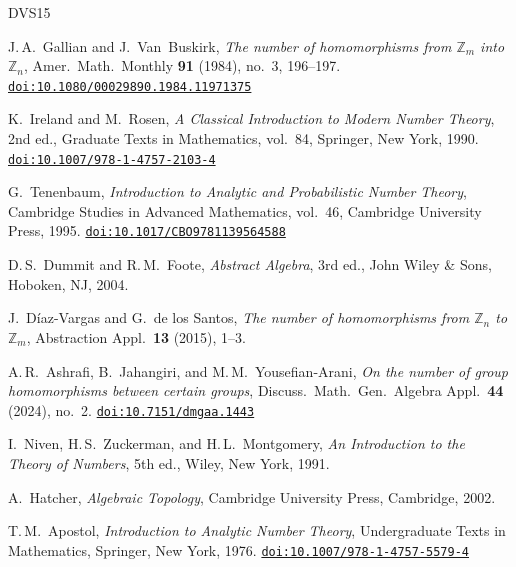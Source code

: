 \documentclass[12pt]{amsart}
\theoremstyle{bluehead}
\theoremstyle{orangehead}
\theoremstyle{greenhead}
\begin{document}
\begin{thebibliography}{DVS15}

J.\,A.\ Gallian and J.\ Van~Buskirk,
\textit{The number of homomorphisms from $\mathbb{Z}_m$ into $\mathbb{Z}_n$},
Amer.\ Math.\ Monthly \textbf{91} (1984), no.\ 3, 196--197.
\href{https://doi.org/10.1080/00029890.1984.11971375}{%
  \texttt{doi:10.1080/00029890.1984.11971375}}

K.\ Ireland and M.\ Rosen,
\textit{A Classical Introduction to Modern Number Theory},
2nd ed., Graduate Texts in Mathematics, vol.\ 84,
Springer, New York, 1990.
\href{https://doi.org/10.1007/978-1-4757-2103-4}%
{\texttt{doi:10.1007/978-1-4757-2103-4}}

G.\ Tenenbaum,
\textit{Introduction to Analytic and Probabilistic Number Theory},
Cambridge Studies in Advanced Mathematics, vol.\ 46,
Cambridge University Press, 1995.
\href{https://doi.org/10.1017/CBO9781139564588}%
{\texttt{doi:10.1017/CBO9781139564588}}

D.\,S.\ Dummit and R.\,M.\ Foote,
\textit{Abstract Algebra}, 3rd ed.,
John Wiley \& Sons, Hoboken, NJ, 2004.

J.\ D{\'i}az-Vargas and G.\ de los Santos,
\textit{The number of homomorphisms from $\mathbb{Z}_n$ to $\mathbb{Z}_m$},
Abstraction Appl.\ \textbf{13} (2015), 1--3.

A.\,R.\ Ashrafi, B.\ Jahangiri, and M.\,M.\ Yousefian-Arani,
\textit{On the number of group homomorphisms between certain groups},
Discuss.\ Math.\ Gen.\ Algebra Appl.\ \textbf{44} (2024), no.\ 2.
\href{https://doi.org/10.7151/dmgaa.1443}%
{\texttt{doi:10.7151/dmgaa.1443}}

I.\ Niven, H.\,S.\ Zuckerman, and H.\,L.\ Montgomery,
\textit{An Introduction to the Theory of Numbers},
5th ed., Wiley, New York, 1991.

A.\ Hatcher,
\textit{Algebraic Topology},
Cambridge University Press, Cambridge, 2002.

T.\,M.\ Apostol,
\textit{Introduction to Analytic Number Theory},
Undergraduate Texts in Mathematics,
Springer, New York, 1976.
\href{https://doi.org/10.1007/978-1-4757-5579-4}%
{\texttt{doi:10.1007/978-1-4757-5579-4}}

\end{thebibliography}
\end{document}

